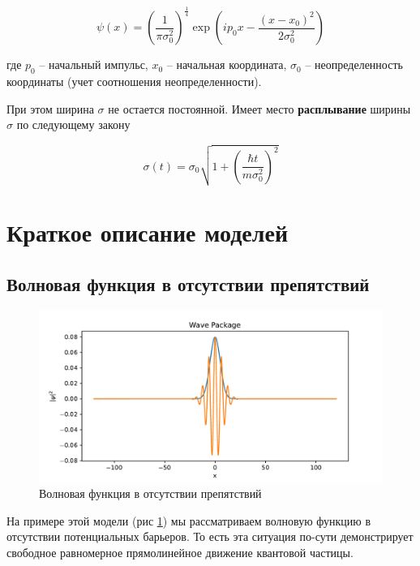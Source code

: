 \documentclass[a4paper, 12pt]{article}
\begin{document}
    \begin{equation}
        \psi(x) = \left(\frac{1}{\pi \sigma_0^2} \right)^{\frac{1}{4}} \exp{\left(ip_0 x - \frac{(x - x_0)^2}{2 \sigma_0^2} \right)}
    \end{equation}

    где $p_0$ -- начальный импульс, $x_0$ -- начальная координата, $\sigma_0$ -- неопределенность координаты
    (учет соотношения неопределенности).

    При этом ширина $\sigma$ не остается постоянной. Имеет место \textbf{расплывание} ширины $\sigma$ по следующему
    закону

    \begin{equation}
        \sigma(t) = \sigma_0 \sqrt{1 + \left(\frac{\hbar t}{m \sigma_0^2} \right)^2}
    \end{equation}

    \section{Краткое описание моделей}

    \subsection{Волновая функция в отсутствии препятствий}

    \begin{figure}
        \centering
        \includegraphics[scale=0.5]{images/WavePackage.pdf}
        \caption{Волновая функция в отсутствии препятствий}
        \label{fig:WavePackage}
    \end{figure}

    На примере этой модели (рис \ref{fig:WavePackage}) мы рассматриваем волновую функцию в отсутствии потенциальных барьеров. То 
    есть эта ситуация по-сути демонстрирует свободное равномерное прямолинейное движение квантовой частицы. 
\end{document}
